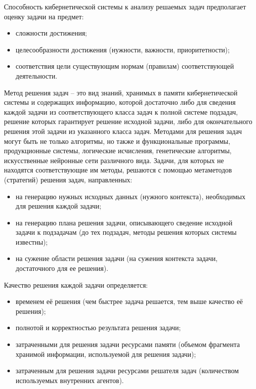Способность кибернетической системы к анализу решаемых задач предполагает оценку задачи на предмет:
\begin{itemize}
    \item{сложности достижения;}
    \item{целесообразности достижения (нужности, важности, приоритетности);}
    \item{соответствия цели существующим нормам (правилам) соответствующей деятельности.}
\end{itemize}


Метод решения задач – это вид знаний, хранимых в памяти кибернетической системы и содержащих информацию, которой достаточно либо для сведения каждой задачи из соответствующего класса задач к полной системе подзадач, решение которых гарантирует решение исходной задачи, либо для окончательного решения этой задачи из указанного класса задач. 
Методами для решения задач могут быть не только алгоритмы, но также и функциональные программы, продукционные системы, логические исчисления, генетические алгоритмы, искусственные нейронные сети различного вида.
Задачи, для которых не находятся соответствующие им методы, решаются с помощью метаметодов (стратегий) решения задач, направленных:
\begin{itemize}
    \item{на генерацию нужных исходных данных (нужного контекста), необходимых для решения каждой задачи;}
    \item{на генерацию плана решения задачи, описывающего сведение исходной задачи к подзадачам (до тех подзадач, методы решения которых системы известны);}
    \item{на сужение области решения задачи (на сужения контекста задачи, достаточного для ее решения).}
\end{itemize}

Качество решения каждой задачи определяется:
\begin{itemize}
    \item{временем её решения (чем быстрее задача решается, тем выше качество её решения);}
    \item{полнотой и корректностью результата решения задачи;}
    \item{затраченными для решения задачи ресурсами памяти (объемом фрагмента хранимой информации, используемой для решения задачи);}
    \item{затраченным для решения задачи ресурсами решателя задач (количеством используемых внутренних агентов).}
\end{itemize}

